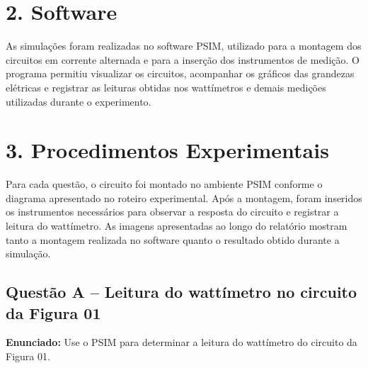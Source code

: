 \documentclass[12pt,a4paper]{article}
\begin{document}
\section*{2. Software}

As simulações foram realizadas no software PSIM, utilizado para a montagem dos circuitos em corrente alternada e para a inserção dos instrumentos de medição. O programa permitiu visualizar os circuitos, acompanhar os gráficos das grandezas elétricas e registrar as leituras obtidas nos wattímetros e demais medições utilizadas durante o experimento.

\newpage

\section*{3. Procedimentos Experimentais}

Para cada questão, o circuito foi montado no ambiente PSIM conforme o diagrama apresentado no roteiro experimental. Após a montagem, foram inseridos os instrumentos necessários para observar a resposta do circuito e registrar a leitura do wattímetro. As imagens apresentadas ao longo do relatório mostram tanto a montagem realizada no software quanto o resultado obtido durante a simulação.

\subsection*{Questão A -- Leitura do wattímetro no circuito da Figura 01}

\textbf{Enunciado:} Use o PSIM para determinar a leitura do wattímetro do circuito da Figura 01.

\vspace{0.5cm}
\end{document}
